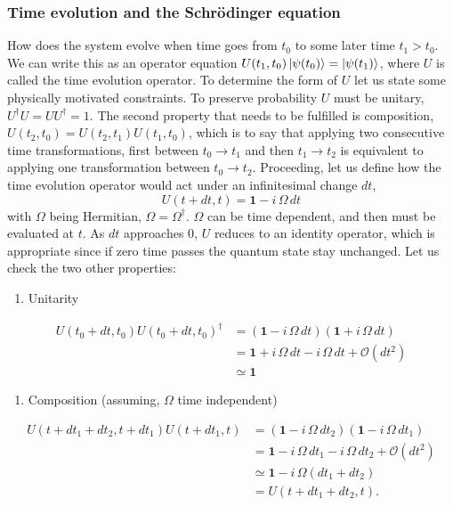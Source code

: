 \subsubsection{Time evolution and the Schrödinger equation}
How does the system evolve when time goes from $t_0$ to some later time $t_1 > t_0$. We can write this as an operator equation $U(t_1,t_0)\ket{\psi(t_0)} = \ket{\psi(t_1)}$, where $U$ is called the time evolution operator. To determine the form of $U$ let us state some physically motivated constraints. To preserve probability $U$ must be unitary, $U^\dagger U = UU^\dagger = 1$. The second property that needs to be fulfilled is composition, $U(t_2,t_0) = U(t_2,t_1)U(t_1,t_0)$, which is to say that applying two consecutive time transformations, first between $t_0 \rightarrow t_1$ and then $t_1 \rightarrow t_2$ is equivalent to applying one transformation between $t_0 \rightarrow t_2$. 
Proceeding, let us define how the time evolution operator would act under an infinitesimal change $dt$,
\begin{equation}
U(t+dt, t) = \mathbf{1} - i\,\Omega\,dt
\end{equation}
with $\Omega$ being Hermitian, $\Omega = \Omega^\dagger$. $\Omega$ can be time dependent, and then must be evaluated at $t$. As $dt$ approaches $0$, $U$ reduces to an identity operator, which is appropriate since if zero time passes the quantum state stay  unchanged.
Let us check the two other properties:
\begin{enumerate}
\item Unitarity
\end{enumerate}
\begin{equation}
\begin{aligned}
U(t_0 +dt, t_0)U(t_0 +dt, t_0)^\dagger &= \left( \mathbf{1} - i\,\Omega\,dt \right)\left(\mathbf{1} + i\,\Omega\,dt \right) \\&= \mathbf{1} + i\,\Omega\,dt - i\,\Omega\,dt + \mathcal{O}(dt^2) \\&\simeq \mathbf{1}
\end{aligned}
\end{equation}
\begin{enumerate}[resume]
\item Composition (assuming, $\Omega$ time independent)
\end{enumerate}
\begin{equation}
\begin{aligned}
U(t + dt_1 + dt_2,t + dt_1)U(t+ dt_1,t) &= (\mathbf{1} - i\,\Omega\,dt_2)(\mathbf{1} - i\,\Omega\,dt_1) \\&= \mathbf{1} - i\,\Omega\,dt_1 - i\,\Omega\,dt_2 + \mathcal{O}(dt^2) \\&\simeq \mathbf{1} - i\,\Omega(dt_1 + dt_2) \\&= U(t + dt_1 + dt_2,t).
\end{aligned}
\end{equation}
